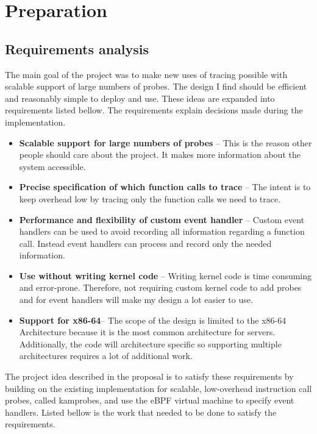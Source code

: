 \chapter{Preparation}
 
\section {Requirements analysis} 
    The main goal of the project was to make new uses of tracing possible with scalable support of large numbers of probes. The design I find should be efficient and reasonably simple to deploy and use. These ideas are expanded into requirements listed bellow. The requirements explain decisions made during the implementation.

    \begin{itemize}
        \item \textbf{Scalable support for large numbers of probes} -- This is the reason other people should care about the project. It makes more information about the system accessible.
        \item \textbf{Precise specification of which function calls to trace} -- The intent is to keep overhead low by tracing only the function calls we need to trace.
        \item \textbf{Performance and flexibility of custom event handler} -- Custom event handlers can be used to avoid recording all information regarding a function call. Instead event handlers can process and record only the needed information.
        \item \textbf{Use without writing kernel code} -- Writing kernel code is time consuming and error-prone. Therefore, not requiring custom kernel code to add probes and for event handlers will make my design a lot easier to use.
        \item \textbf{Support for x86-64}-- The scope of the design is limited to the x86-64 Architecture because it is the most common architecture for servers. Additionally, the code will architecture specific so supporting multiple architectures requires a lot of additional work.
    \end{itemize}
    
    The project idea described in the proposal is to satisfy these requirements by building on the existing implementation for scalable, low-overhead instruction call probes, called kamprobes, and use the eBPF virtual machine to specify event handlers. Listed bellow is the work that needed to be done to satisfy the requirements.

